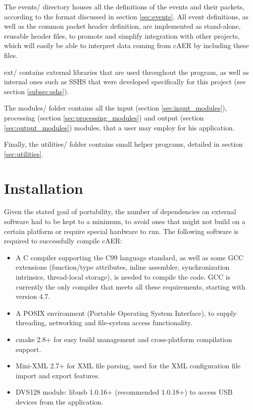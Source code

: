 \documentclass[a4paper,12pt]{report}
\begin{document}
The events/ directory houses all the definitions of the events and their packets, according to the format discussed in section \ref{sec:events}.
All event definitions, as well as the common packet header definition, are implemented as stand-alone, reusable header files, to promote and simplify integration with other projects, which will easily be able to interpret data coming from cAER by including these files.

ext/ contains external libraries that are used throughout the program, as well as internal ones such as SSHS that were developed specifically for this project (see section \ref{subsec:sshs}).

The modules/ folder contains all the input (section \ref{sec:input_modules}), processing (section \ref{sec:processing_modules}) and output (section \ref{sec:output_modules}) modules, that a user may employ for his application.

Finally, the utilities/ folder contains small helper programs, detailed in section \ref{sec:utilities}.

\section{Installation} \label{sec:installation}

Given the stated goal of portability, the number of dependencies on external software had to be kept to a minimum, to avoid ones that might not build on a certain platform or require special hardware to run.
\clearpage
The following software is required to successfully compile cAER:
\begin{itemize}
\item A C compiler supporting the C99 language standard, as well as some GCC extensions (function/type attributes, inline assembler, synchronization intrinsics, thread-local storage), is needed to compile the code. GCC is currently the only compiler that meets all these requirements, starting with version 4.7.
\item A POSIX environment (Portable Operating System Interface), to supply threading, networking and file-system access functionality.
\item cmake 2.8+ for easy build management and cross-platform compilation support.
\item Mini-XML 2.7+ for XML file parsing, used for the XML configuration file import and export features.
\item DVS128 module: libusb 1.0.16+ (recommended 1.0.18+) to access USB devices from the application.
\end{itemize}
\end{document}

